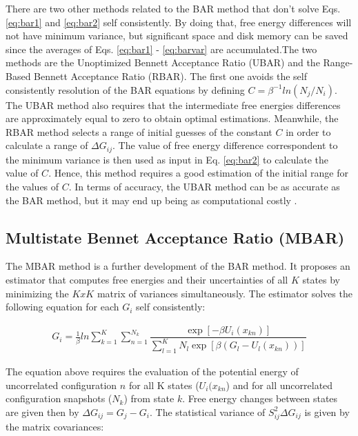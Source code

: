 There are two other methods related to the BAR method that don't solve Eqs. \eqref{eq:bar1} and \eqref{eq:bar2} self consistently. By doing that, free energy differences will not have minimum variance, but significant space and disk memory can be saved since the averages of Eqs. \eqref{eq:bar1} - \eqref{eq:barvar} are accumulated.The two methods are the Unoptimized Bennett Acceptance Ratio (UBAR) and the Range-Based Bennett Acceptance Ratio (RBAR). The first one avoids the self consistently resolution of the BAR equations by defining $C=\beta^{-1}ln(N_{j}/N_{i})$. The UBAR method also requires that the intermediate free energies differences are approximately equal to zero to obtain optimal estimations. Meanwhile, the RBAR method selects a range of initial guesses of the constant $C$ in order to calculate a range  of $\Delta G_{ij}$. The value of free energy difference correspondent to the minimum variance is then used as input in Eq. \eqref{eq:bar2} to calculate the value of $C$. Hence, this method requires a good estimation of the initial range for the values of $C$. In terms of accuracy, the UBAR method can be as accurate as the BAR method, but it may end up being as computational costly \cite{bareva}.  

\subsection{Multistate Bennet Acceptance Ratio (MBAR)}\label{mbar}

The MBAR method \cite{mbar} is a further development of the BAR method. It proposes an estimator that computes free energies and their uncertainties of all $K$ states  by minimizing the $KxK$ matrix of variances simultaneously. The estimator solves the following equation for each $G_{i}$ self consistently:

\begin{equation}
\label{eq:mbar}
\begin{aligned}
G_{i} = \frac{1}{\beta}ln \sum_{k=1}^{K} \sum_{n=1}^{N_{k}}
\dfrac{\exp[-\beta U_{i}(x_{kn})]}{\sum_{l=1}^{K} N_{l} \exp[\beta (G_{l} - U_{l}(x_{kn}))]}
\end{aligned}
\end{equation}

The equation above requires the evaluation of the potential energy  of uncorrelated configuration $n$ for all K states ($U_{i}(x_{kn}$) and for all uncorrelated configuration snapshots ($N_{k}$) from state $k$. Free energy changes between states are given then by $\Delta G_{ij} = G_{j} -  G_{i}$. The statistical variance of $S_{ij}^{2} \Delta G_{ij}$ is given by the matrix covariances:

